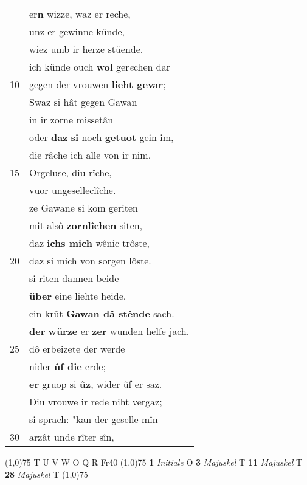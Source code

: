 \documentclass[8pt,a4paper,notitlepage]{article}
\begin{document}
\begin{table}[ht]
\begin{minipage}[t]{0.5\linewidth}
\begin{tabular}{rl}
 & er\textbf{n} wizze, waz er reche,\\ 
 & unz er gewinne künde,\\ 
 & wiez umb ir herze stüende.\\ 
 & ich künde ouch \textbf{wol} ger\textit{e}chen dar\\ 
10 & gegen der vrouwen \textbf{lieht gevar};\\ 
 & Swaz si hât gegen Gawan\\ 
 & in ir zorne missetân\\ 
 & oder \textbf{daz} \textbf{si} noch \textbf{getuot} gein im,\\ 
 & die râche ich alle von ir nim.\\ 
15 & Orgeluse, diu rîche,\\ 
 & vuor ungeselleclîche.\\ 
 & ze Gawane si kom geriten\\ 
 & mit alsô \textbf{zornlîchen} siten,\\ 
 & daz \textbf{ichs mich} wênic trôste,\\ 
20 & daz si mich von sorgen lôste.\\ 
 & si riten dannen beide\\ 
 & \textbf{über} eine liehte heide.\\ 
 & ein krût \textbf{Gawan dâ stênde} sach.\\ 
 & \textbf{der} \textbf{würze} er \textbf{zer} wunden helfe jach.\\ 
25 & dô erbeizete der werde\\ 
 & nider \textbf{ûf die} erde;\\ 
 & \textbf{er} gruop si \textbf{ûz}, wider ûf er saz.\\ 
 & Diu vrouwe ir rede niht vergaz;\\ 
 & si sprach: "kan der geselle mîn\\ 
30 & arzât unde rîter sîn,\\ 
\end{tabular}
\scriptsize
\line(1,0){75} \newline
T U V W O Q R Fr40 \newline
\line(1,0){75} \newline
\textbf{1} \textit{Initiale} O  \textbf{3} \textit{Majuskel} T  \textbf{11} \textit{Majuskel} T  \textbf{28} \textit{Majuskel} T  \newline
\line(1,0){75} \newline

\end{minipage}
\end{table}
\end{document}

